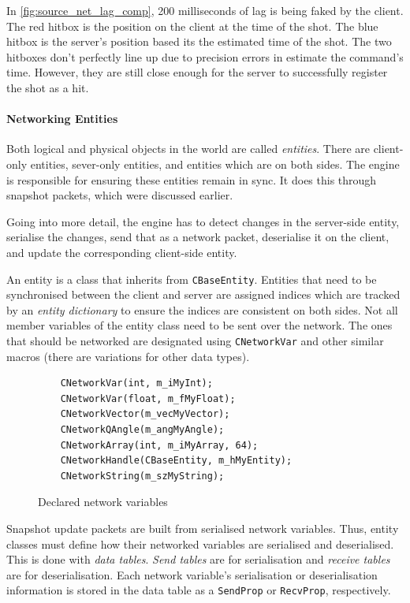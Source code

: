 \documentclass[a4paper, 12pt]{scrartcl}
\begin{document}
In \cref{fig:source_net_lag_comp}, 200 milliseconds of lag is being faked by the client. The red hitbox is the position on the client at the time of the shot. The blue hitbox is the server's position based its the estimated time of the shot. The two hitboxes don't perfectly line up due to precision errors in estimate the command's time. However, they are still close enough for the server to successfully register the shot as a hit.

\paragraph{Networking Entities}
Both logical and physical objects in the world are called \textit{entities}. There are client-only entities, sever-only entities, and entities which are on both sides. The engine is responsible for ensuring these entities remain in sync. It does this through snapshot packets, which were discussed earlier.

Going into more detail, the engine has to detect changes in the server-side entity, serialise the changes, send that as a network packet, deserialise it on the client, and update the corresponding client-side entity.

An entity is a class that inherits from \texttt{CBaseEntity}. Entities that need to be synchronised between the client and server are assigned indices which are tracked by an \textit{entity dictionary} to ensure the indices are consistent on both sides. Not all member variables of the entity class need to be sent over the network. The ones that should be networked are designated using \texttt{CNetworkVar} and other similar macros (there are variations for other data types).

\begin{figure}[!htp]
  \begin{verbatim}
    CNetworkVar(int, m_iMyInt);
    CNetworkVar(float, m_fMyFloat);
    CNetworkVector(m_vecMyVector);
    CNetworkQAngle(m_angMyAngle);
    CNetworkArray(int, m_iMyArray, 64);
    CNetworkHandle(CBaseEntity, m_hMyEntity);
    CNetworkString(m_szMyString);
  \end{verbatim}
  \caption{Declared network variables}
  \label{fig:source_net_var}
\end{figure}

Snapshot update packets are built from serialised network variables. Thus, entity classes must define how their networked variables are serialised and deserialised. This is done with \textit{data tables}. \textit{Send tables} are for serialisation and \textit{receive tables} are for deserialisation. Each network variable's serialisation or deserialisation information is stored in the data table as a \texttt{SendProp} or \texttt{RecvProp}, respectively.
\end{document}

